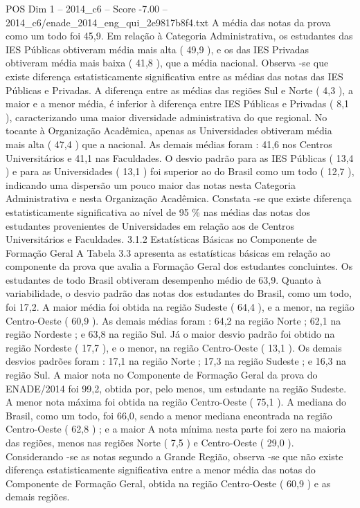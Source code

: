 \begin{textsample}{POS Dim 1 – 2014\_c6 – Score -7.00 – 2014\_c6/enade\_2014\_eng\_qui\_2e9817b8f4.txt}
A média das notas da prova como um todo foi 45,9.
Em relação à Categoria Administrativa, os estudantes das IES Públicas obtiveram média mais alta ( 49,9 ), e os das IES Privadas obtiveram média mais baixa ( 41,8 ), que a média nacional.
Observa -se que existe diferença estatisticamente significativa entre as médias das notas das IES Públicas e Privadas.
A diferença entre as médias das regiões Sul e Norte ( 4,3 ), a maior e a menor média, é inferior à diferença entre IES Públicas e Privadas ( 8,1 ), caracterizando uma maior diversidade administrativa do que regional.
No tocante à Organização Acadêmica, apenas as Universidades obtiveram média mais alta ( 47,4 ) que a nacional.
As demais médias foram : 41,6 nos Centros Universitários e 41,1 nas Faculdades.
O desvio padrão para as IES Públicas ( 13,4 ) e para as Universidades ( 13,1 ) foi superior ao do Brasil como um todo ( 12,7 ), indicando uma dispersão um pouco maior das notas nesta Categoria Administrativa e nesta Organização Acadêmica.
Constata -se que existe diferença estatisticamente significativa ao nível de 95 \% nas médias das notas dos estudantes provenientes de Universidades em relação aos de Centros Universitários e Faculdades. 3.1.2 Estatísticas Básicas no Componente de Formação Geral A Tabela 3.3 apresenta as estatísticas básicas em relação ao componente da prova que avalia a Formação Geral dos estudantes concluintes.
Os estudantes de todo Brasil obtiveram desempenho médio de 63,9.
Quanto à variabilidade, o desvio padrão das notas dos estudantes do Brasil, como um todo, foi 17,2.
A maior média foi obtida na região Sudeste ( 64,4 ), e a menor, na região Centro-Oeste ( 60,9 ).
As demais médias foram : 64,2 na região Norte ; 62,1 na região Nordeste ; e 63,8 na região Sul.
Já o maior desvio padrão foi obtido na região Nordeste ( 17,7 ), e o menor, na região Centro-Oeste ( 13,1 ).
Os demais desvios padrões foram : 17,1 na região Norte ; 17,3 na região Sudeste ; e 16,3 na região Sul.
A maior nota no Componente de Formação Geral da prova do ENADE/2014 foi 99,2, obtida por, pelo menos, um estudante na região Sudeste.
A menor nota máxima foi obtida na região Centro-Oeste ( 75,1 ).
A mediana do Brasil, como um todo, foi 66,0, sendo a menor mediana encontrada na região Centro-Oeste ( 62,8 ) ; e a maior A nota mínima nesta parte foi zero na maioria das regiões, menos nas regiões Norte ( 7,5 ) e Centro-Oeste ( 29,0 ).
Considerando -se as notas segundo a Grande Região, observa -se que não existe diferença estatisticamente significativa entre a menor média das notas do Componente de Formação Geral, obtida na região Centro-Oeste ( 60,9 ) e as demais regiões.

\end{textsample}

